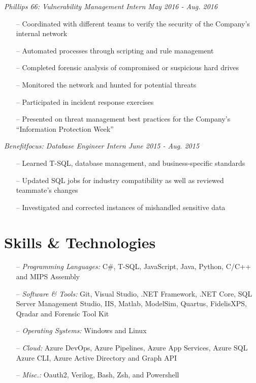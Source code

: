 \documentclass[line,overlapped,9pt]{res}
\begin{document}
\begin{resume}
                 {\sl Phillips 66: Vulnerability Management Intern
                   \hfill        May 2016 - Aug. 2016}
                  \begin{itemize}
                  \item[--] Coordinated with different teams to verify the security of
                    the Company's internal network
                  \item[--] Automated processes through scripting and rule management
                  \item[--] Completed forensic analysis of compromised or suspicious
                    hard drives
                  \item[--] Monitored the network and hunted for potential threats
                  \item[--] Participated in incident response exercises 
                  \item[--] Presented on threat management best practices for the Company's ``Information
                    Protection Week''
                  \end{itemize}

                  {\sl Benefitfocus: Database Engineer Intern 
                    \hfill        June 2015 - Aug. 2015}
                  \begin{itemize}
                  \item[--] Learned T-SQL, database management, and business-specific
                    standards
                  \item[--] Updated SQL jobs for industry compatibility as well as reviewed
                    teammate's changes
                  \item[--] Investigated and corrected instances of mishandled sensitive data
                  \end{itemize}

     \section{Skills \& Technologies}

            \begin{itemize} 
            \item[--] {\sl Programming Languages:} C\#, T-SQL, JavaScript, Java, Python, C/C++ and MIPS Assembly 
            \item[--] {\sl Software \& Tools:} Git, Visual Studio, .NET Framework, .NET Core,
              SQL Server Management Studio, IIS, Matlab, ModelSim, Quartus,
              FidelisXPS, Qradar and Forensic Tool Kit 
            \item[--] {\sl Operating Systems:} Windows and Linux
            \item[--] {\sl Cloud:} Azure DevOps, Azure Pipelines, Azure App Services, Azure SQL
              Azure CLI, Azure Active Directory and Graph API
            \item[--] {\sl Misc.:} Oauth2, Verilog, Bash, Zsh, and Powershell  
            \end{itemize} 


\end{resume}
\end{document}
